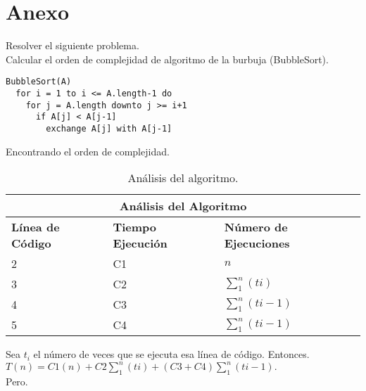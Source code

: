 \documentclass[12pt]{report}
\begin{document}
	
	\section{Anexo}
	
	Resolver el siguiente problema.\\
	
	Calcular el orden de complejidad de algoritmo de la burbuja (BubbleSort).\\
	
	\lstset{language=vhdl, breaklines=true, basicstyle=\footnotesize}
	\lstset{numbers=left, numberstyle=\tiny, stepnumber=1, numbersep=10pt}
	\begin{lstlisting}
BubbleSort(A)
  for i = 1 to i <= A.length-1 do
    for j = A.length downto j >= i+1
      if A[j] < A[j-1]
        exchange A[j] with A[j-1]
	\end{lstlisting}
	
	Encontrando el orden de complejidad.\\
	
	\begin{table}[htbp]
		\begin{center}
			\begin{tabular}{|l|l|l|}
				\hline
				\multicolumn{3}{|c|}{Análisis del Algoritmo} \\ 
				\hline
				\textbf{Línea de Código} & \textbf{Tiempo Ejecución} & \textbf{Número de Ejecuciones}\\
				\hline
				2 & C1 & $n$ \\ \hline
				3 & C2 & $\sum_{1}^{n}(ti)$ \\ \hline
				4 & C3 & $\sum_{1}^{n}(ti-1)$ \\ \hline
				5 & C4 & $\sum_{1}^{n}(ti-1)$ \\ \hline
			\end{tabular}
			\caption{Análisis del algoritmo.}
			\label{tabla:analisis3}
		\end{center}
	\end{table}\newpage

Sea $t_{i}$ el número de veces que se ejecuta esa línea de código. Entonces.
$T(n)=C1(n)+C2\sum_{1}^{n}(ti)+(C3+C4)\sum_{1}^{n}(ti-1).$\\

Pero.\\
\end{document}
